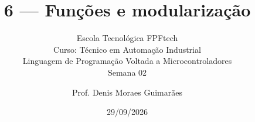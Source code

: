 \title{6 — Funções e modularização}
\subtitle{\texorpdfstring{Escola Tecnológica FPFtech\\[0.2cm]
Curso: Técnico em Automação Industrial\\[0.2cm]
\small Linguagem de Programação Voltada a Microcontroladores\\[0.15cm]
Semana 02}{FPFtech — Técnico em Automação Industrial — Semana 02}}
\author{Prof. Denis Moraes Guimarães}
\date{29/09/2026}
